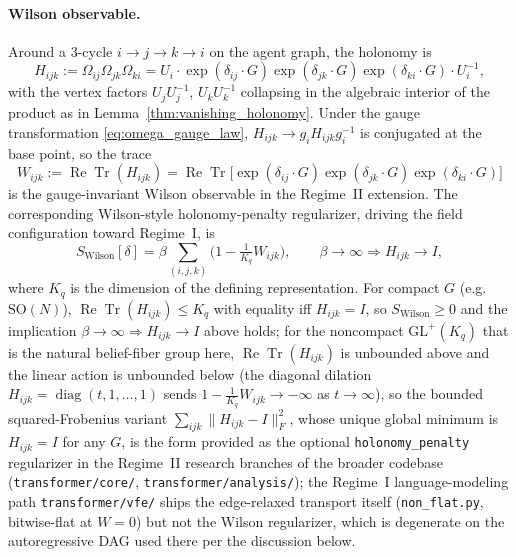 \documentclass[11pt]{article}
\begin{document}
\paragraph{Wilson observable.} Around a 3-cycle $i\to j\to k\to i$ on the agent graph, the holonomy is
\begin{equation}
H_{ijk}
:= \Omega_{ij}\Omega_{jk}\Omega_{ki}
= U_i \cdot \exp(\delta_{ij}\cdot G) \exp(\delta_{jk}\cdot G) \exp(\delta_{ki}\cdot G) \cdot U_i^{-1},
\label{eq:discrete_holonomy}
\end{equation}
with the vertex factors $U_jU_j^{-1}$, $U_kU_k^{-1}$ collapsing in the algebraic interior of the product as in Lemma~\ref{thm:vanishing_holonomy}. Under the gauge transformation \eqref{eq:omega_gauge_law}, $H_{ijk} \to g_i H_{ijk} g_i^{-1}$ is conjugated at the base point, so the trace
\begin{equation}
W_{ijk} := \operatorname{Re}\operatorname{Tr}(H_{ijk})
= \operatorname{Re}\operatorname{Tr}\big[\exp(\delta_{ij}\cdot G) \exp(\delta_{jk}\cdot G) \exp(\delta_{ki}\cdot G)\big]
\label{eq:wilson_observable}
\end{equation}
is the gauge-invariant Wilson observable in the Regime~II extension. The corresponding Wilson-style holonomy-penalty regularizer, driving the field configuration toward Regime~I, is
\begin{equation}
S_{\mathrm{Wilson}}[\delta]
= \beta \sum_{(i,j,k)} \Big(1 - \tfrac{1}{K_q} W_{ijk}\Big),
\qquad
\beta \to \infty \Longrightarrow H_{ijk} \to I,
\label{eq:wilson_action}
\end{equation}
where $K_q$ is the dimension of the defining representation. For compact $G$ (e.g.\ $\mathrm{SO}(N)$), $\operatorname{Re}\operatorname{Tr}(H_{ijk}) \le K_q$ with equality iff $H_{ijk} = I$, so $S_{\mathrm{Wilson}} \ge 0$ and the implication $\beta \to \infty \Rightarrow H_{ijk} \to I$ above holds; for the noncompact $\mathrm{GL}^+(K_q)$ that is the natural belief-fiber group here, $\operatorname{Re}\operatorname{Tr}(H_{ijk})$ is unbounded above and the linear action is unbounded below (the diagonal dilation $H_{ijk} = \operatorname{diag}(t,1,\ldots,1)$ sends $1 - \tfrac{1}{K_q}W_{ijk} \to -\infty$ as $t \to \infty$), so the bounded squared-Frobenius variant $\sum_{ijk}\|H_{ijk} - I\|_F^2$, whose unique global minimum is $H_{ijk} = I$ for any $G$, is the form provided as the optional \texttt{holonomy\_penalty} regularizer in the Regime~II research branches of the broader codebase (\texttt{transformer/core/}, \texttt{transformer/analysis/}); the Regime~I language-modeling path \texttt{transformer/vfe/} ships the edge-relaxed transport itself (\texttt{non\_flat.py}, bitwise-flat at $W=0$) but not the Wilson regularizer, which is degenerate on the autoregressive DAG used there per the discussion below.
\end{document}
